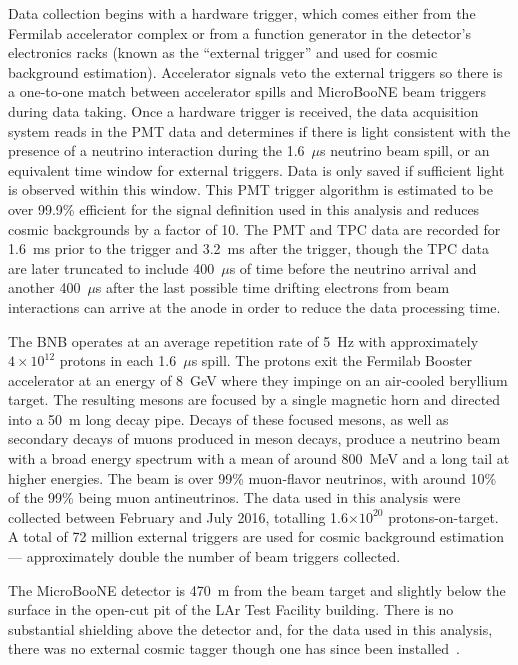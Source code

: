 \documentclass[%
twocolumn,
 amsmath,amssymb,
 aps,
prd,
superscriptaddress,showpacs]{revtex4-2}
\begin{document}
Data collection begins with a hardware trigger, which comes either from the Fermilab accelerator complex or from a function generator in the detector's electronics racks (known as the ``external trigger'' and used for cosmic background estimation).
Accelerator signals veto the external triggers so there is a one-to-one match between accelerator spills and MicroBooNE beam triggers during data taking.
Once a hardware trigger is received, the data acquisition system reads in the PMT data and determines if there is light consistent with the presence of a neutrino interaction during the 1.6~$\mu$s neutrino beam spill, or an equivalent time window for external triggers.
Data is only saved if sufficient light is observed within this window.
This PMT trigger algorithm is estimated to be over 99.9\% efficient for the signal definition used in this analysis and reduces cosmic backgrounds by a factor of 10.
The PMT and TPC data are recorded for 1.6~ms prior to the trigger and 3.2~ms after the trigger, though the TPC data are later truncated to include 400~$\mu$s of time before the neutrino arrival and another 400~$\mu$s after the last possible time drifting electrons from beam interactions can arrive at the anode in order to reduce the data processing time.

The BNB operates at an average repetition rate of 5~Hz with approximately $4 \times 10^{12}$ protons in each 1.6~$\mu$s spill.
The protons exit the Fermilab Booster accelerator at an energy of 8~GeV where they impinge on an air-cooled beryllium target.
The resulting mesons are focused by a single magnetic horn and directed into a 50~m long decay pipe.
Decays of these focused mesons, as well as secondary decays of muons produced in meson decays, produce a neutrino beam with a broad energy spectrum with a mean of around 800~MeV and a long tail at higher energies.
The beam is over 99\% muon-flavor neutrinos, with around 10\% of the 99\% being muon antineutrinos.
The data used in this analysis were collected between February and July 2016, totalling 1.6$\times 10^{20}$ protons-on-target.
A total of 72 million external triggers are used for cosmic background estimation --- approximately double the number of beam triggers collected.

The MicroBooNE detector is 470~m from the beam target and slightly below the surface in the open-cut pit of the LAr Test Facility building.
There is no substantial shielding above the detector and, for the data used in this analysis, there was no external cosmic tagger though one has since been installed~\cite{Adams:2019bztCOSMICTAGGER}.
\end{document}
